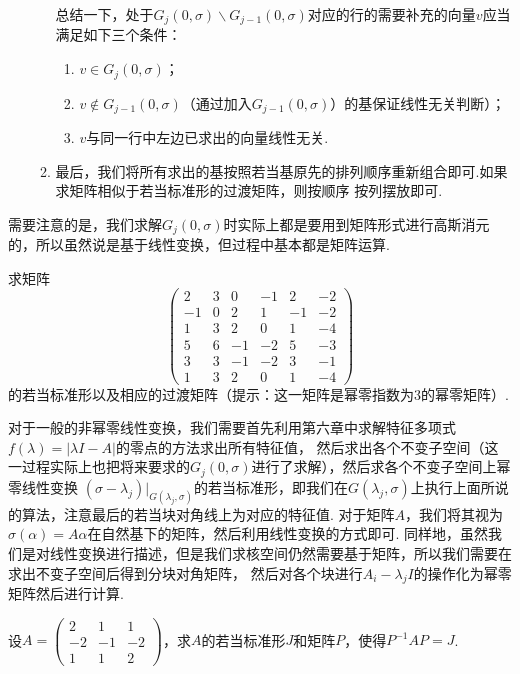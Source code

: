 \begin{enumerate}
\begin{enumerate}[label=(\arabic*)]
        总结一下，处于$G_j(0,\sigma)\backslash G_{j-1}(0,\sigma)$对应的行的需要补充的向量$v$应当满足如下三个条件：
        \begin{enumerate}[label=(\roman*)]
            \item $v\in G_j(0,\sigma)$；

            \item $v\notin G_{j-1}(0,\sigma)$（通过加入$G_{j-1}(0,\sigma)$）的基保证线性无关判断）；

            \item $v$与同一行中左边已求出的向量线性无关.
        \end{enumerate}
        \item 最后，我们将所有求出的基按照若当基原先的排列顺序重新组合即可.如果求矩阵相似于若当标准形的过渡矩阵，则按顺序
        按列摆放即可.
    \end{enumerate}
\end{enumerate}
需要注意的是，我们求解$G_j(0,\sigma)$时实际上都是要用到矩阵形式进行高斯消元的，所以虽然说是基于线性变换，但过程中基本都是矩阵运算.
\begin{example}
    求矩阵\[\begin{pmatrix}
        2 & 3 & 0 & -1 & 2 & -2 \\ -1 & 0 & 2 & 1 & -1 & -2 \\
        1 & 3 & 2 & 0  & 1 & -4 \\ 5 & 6 & -1 & -2 & 5 & -3 \\
        3 & 3 & -1 & -2 & 3 & -1 \\ 1 & 3 & 2 & 0 & 1 & -4
    \end{pmatrix}\]的若当标准形以及相应的过渡矩阵（提示：这一矩阵是幂零指数为3的幂零矩阵）.
\end{example}
\begin{solution}

\end{solution}

对于一般的非幂零线性变换，我们需要首先利用第六章中求解特征多项式$f(\lambda)=|\lambda I-A|$的零点的方法求出所有特征值，
然后求出各个不变子空间（这一过程实际上也把将来要求的$G_j(0,\sigma)$进行了求解），然后求各个不变子空间上幂零线性变换
$(\sigma-\lambda_j)\vert_{G(\lambda_j,\sigma)}$的若当标准形，即我们在$G(\lambda_j,\sigma)$上执行上面所说的算法，注意最后的若当块对角线上为对应的特征值.
对于矩阵$A$，我们将其视为$\sigma(\alpha)=A\alpha$在自然基下的矩阵，然后利用线性变换的方式即可.
同样地，虽然我们是对线性变换进行描述，但是我们求核空间仍然需要基于矩阵，所以我们需要在求出不变子空间后得到分块对角矩阵，
然后对各个块进行$A_i-\lambda_jI$的操作化为幂零矩阵然后进行计算.
\begin{example}
    设$A=\begin{pmatrix}
        2 & 1 & 1 \\ -2 & -1 & -2 \\ 1 & 1 & 2
    \end{pmatrix}$，求$A$的若当标准形$J$和矩阵$P$，使得$P^{-1}AP=J$.
\end{example}
\begin{solution}

\end{solution}

